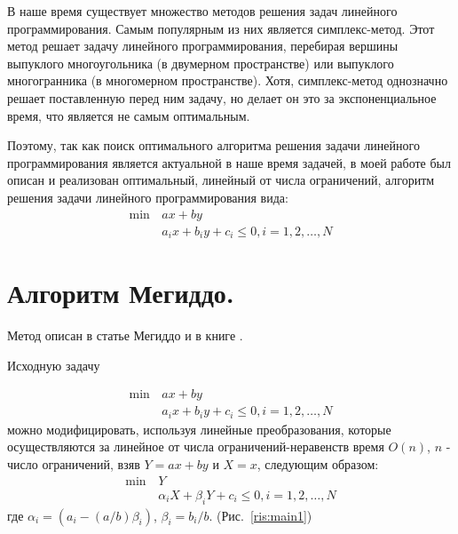 \documentclass[12pt,a4paper]{article}
\begin{document}


В наше время существует множество методов решения задач линейного программирования. Самым популярным из них является симплекс-метод. Этот метод решает задачу линейного программирования, перебирая вершины выпуклого многоугольника (в двумерном пространстве) или выпуклого многогранника (в многомерном пространстве). Хотя, симплекс-метод однозначно решает поставленную перед ним задачу, но делает он это за экспоненциальное время, что является не самым оптимальным.\par 
Поэтому, так как поиск оптимального алгоритма решения задачи линейного программирования является актуальной в наше время задачей, в моей работе был описан и реализован оптимальный, линейный от числа ограничений, алгоритм решения задачи линейного программирования вида:  
\[
\begin{aligned}
	\min\, &ax+by \\
	&a_{i}x+b_{i}y+c_{i} \leqslant 0, i=1,2,\dots,N
\end{aligned}
\]






\newpage
\section{Алгоритм Мегиддо.}
  Метод описан в статье Мегиддо \cite{Megiddo} и в книге \cite{Preparata89}.
  
	Исходную задачу\par
\[
\begin{aligned}
	\min\, & ax+by \\
	&a_{i}x+b_{i}y+c_{i} \leqslant 0, i=1,2,\dots,N
\end{aligned}
\]
можно модифицировать, используя линейные преобразования, которые осуществляются за линейное от числа ограничений-неравенств время $O(n)$, $n$ - число ограничений, взяв $Y=ax+by$ и $X=x$, следующим образом:
\[
\begin{aligned}
	\min\, & Y \\
	&\alpha_{i}X+\beta_{i}Y+c_{i} \leqslant 0, i=1,2,\dots,N
\end{aligned}
\]
где $\alpha_{i}=(a_{i}-(a/b)\beta_{i})$, $\beta_{i}=b_{i}/b$. (Рис.~\ref{ris:main1})\par
\end{document}
